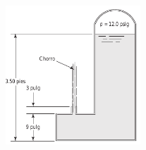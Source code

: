 \documentclass[11pt]{report}
\begin{document}
\begin{figure}[H]
\centering\includegraphics[width=0.45\textwidth]{p9.png}
\caption{\label{fig:fig9}}
\end{figure}


\end{document}

